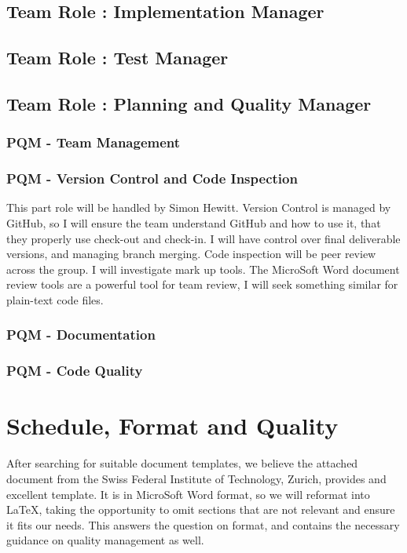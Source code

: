 \documentclass{article}
\begin{document}
\subsection{Team Role : Implementation Manager}

\subsection{Team Role : Test Manager}

\subsection{Team Role : Planning and Quality Manager}

\subsubsection{PQM - Team Management}
\subsubsection{PQM - Version Control and Code Inspection}
This part role will be handled by Simon Hewitt. Version Control is managed by GitHub, so I will ensure the team understand GitHub and how to use it, that they properly use check-out and check-in. I will have control over final deliverable versions, and managing branch merging.
Code inspection will be peer review across the group. I will investigate mark up tools. The MicroSoft Word document review tools are a powerful tool for team review, I will seek something similar for plain-text code files. 
\subsubsection{PQM - Documentation}
\subsubsection{PQM - Code Quality}

\newpage
\section{Schedule, Format and Quality}
After searching for suitable document templates, we believe the attached document from the Swiss Federal Institute of Technology, Zurich, provides and excellent template. It is in MicroSoft Word format, so we will reformat into LaTeX, taking the opportunity to omit sections that are not relevant and ensure it fits our needs. This answers the question on format, and contains the necessary guidance on quality management as well. 
\end{document}
